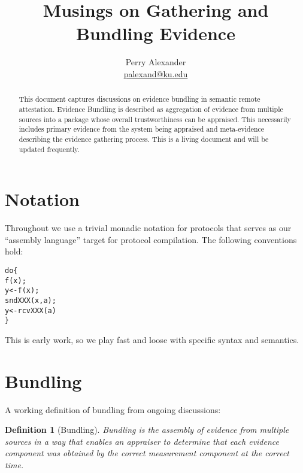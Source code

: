 \documentclass[10pt]{article}
\title{Musings on Gathering and Bundling Evidence}
\author{Perry Alexander \\
 \url{palexand@ku.edu}}
\newtheorem{definition}{Definition}
\begin{document}
\maketitle

\begin{abstract}
  This document captures discussions on evidence bundling in semantic
  remote attestation.  Evidence Bundling is described as aggregation
  of evidence from multiple sources into a package whose overall
  trustworthiness can be appraised.  This necessarily includes primary
  evidence from the system being appraised and meta-evidence
  describing the evidence gathering process.  This is a living
  document and will be updated frequently.
\end{abstract}

\section*{Notation}

Throughout we use a trivial monadic notation for protocols that serves
as our ``assembly language'' target for protocol compilation.
The following conventions hold:

\begin{alltt}
  do \{                % evaluate functions in sequence
       f(x);          % calculate f(x) and discard the result
       y <- f(x);     % calculate f(x) and bind the result to y
       sndXXX(x,a);   % an operation on x that performs a calculation
                      %  and sends data to a
       y <- rcvXXX(a) % an operation that receives data from
                      %  a performs a calculation and binds the
                      %  result to y
  \}
\end{alltt}

This is early work, so we play fast and loose with specific syntax and
semantics.

\section*{Bundling}

A working definition of bundling from ongoing discussions:

\begin{definition}[Bundling]
  Bundling is the assembly of evidence from multiple sources in a way
  that enables an appraiser to determine that each evidence component
  was obtained by the correct measurement component at the correct time.
\end{definition}
\end{document}
